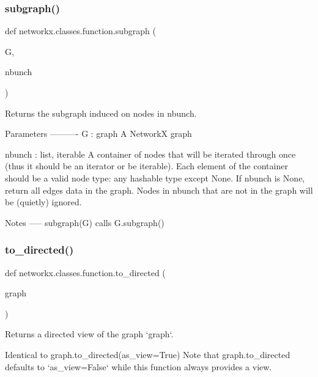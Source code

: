 \subsubsection{\texorpdfstring{subgraph()}{subgraph()}}
{\footnotesize\ttfamily def networkx.\+classes.\+function.\+subgraph (\begin{DoxyParamCaption}\item[{}]{G,  }\item[{}]{nbunch }\end{DoxyParamCaption})}

\begin{DoxyVerb}Returns the subgraph induced on nodes in nbunch.

Parameters
----------
G : graph
   A NetworkX graph

nbunch : list, iterable
   A container of nodes that will be iterated through once (thus
   it should be an iterator or be iterable).  Each element of the
   container should be a valid node type: any hashable type except
   None.  If nbunch is None, return all edges data in the graph.
   Nodes in nbunch that are not in the graph will be (quietly)
   ignored.

Notes
-----
subgraph(G) calls G.subgraph()
\end{DoxyVerb}
 \mbox{\label{namespacenetworkx_1_1classes_1_1function_aa5e5092cd7da6e6ed1c61b46c51f5e09}} 
\subsubsection{\texorpdfstring{to\+\_\+directed()}{to\_directed()}}
{\footnotesize\ttfamily def networkx.\+classes.\+function.\+to\+\_\+directed (\begin{DoxyParamCaption}\item[{}]{graph }\end{DoxyParamCaption})}

\begin{DoxyVerb}Returns a directed view of the graph `graph`.

Identical to graph.to_directed(as_view=True)
Note that graph.to_directed defaults to `as_view=False`
while this function always provides a view.
\end{DoxyVerb}
 \mbox{\label{namespacenetworkx_1_1classes_1_1function_a278629fd7422427c446489efd50f2759}} 
